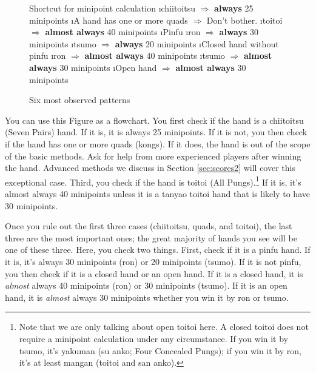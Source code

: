 \bigskip

\begin{figure}[h!]
\begin{itembox}[c]{Shortcut for minipoint calculation}
\be
\i {\jap chiitoitsu} $\Rightarrow$ {\bf always} 25 minipoints
\i A hand has one or more quads $\Rightarrow$ Don't bother. %
\i {\jap toitoi} $\Rightarrow$ {\bf almost always} 40 minipoints
\i {\jap Pinfu}
	\bi
	\i {\jap ron} $\Rightarrow$ {\bf always} 30 minipoints
	\i {\jap tsumo} $\Rightarrow$ {\bf always} 20 minipoints
	\ei
\i Closed hand without {\jap pinfu}
	\bi
	\i {\jap ron} $\Rightarrow$ {\bf almost always} 40 minipoints
	\i {\jap tsumo} $\Rightarrow$ {\bf almost always} 30 minipoints
	\ei
\i Open hand $\Rightarrow$ {\bf almost always} 30 minipoints
\ee
\end{itembox}
\caption{Six most observed patterns}\label{fig:mini}
\end{figure}

You can use this Figure as a flowchart.
You first check if the hand is a {\jap chiitoitsu} (Seven Pairs) hand. If it is, it is always 25 minipoints. If it is not, you then check if the hand has one or more quads (kongs). If it does, the hand is out of the scope of the basic methods. Ask for help from more experienced players after winning the hand. Advanced methods we discuss in Section \ref{sec:scores2} will cover this exceptional case.
Third, you check if the hand is {\jap toitoi} (All Pungs).\footnote{Note that we are only talking about open {\jap toitoi} here. A closed {\jap toitoi} does not require a minipoint calculation under any circumstance. If you win it by {\jap tsumo}, it's {\jap yakuman} ({\jap su anko}; Four Concealed Pungs); if you win it by {\jap ron}, it's at least {\jap mangan} ({\jap toitoi} and {\jap san anko}).} If it is, it's almost always 40 minipoints unless it is a {\jap tanyao toitoi} hand that is likely to have 30 minipoints.

\bigskip
Once you rule out the first three cases ({\jap chiitoitsu}, quads, and {\jap toitoi}), the last three are the most important ones; the great majority of hands you see will be one of these three. Here, you check two things.
First, check if it is a {\jap pinfu} hand. If it is, it's always 30 minipoints ({\jap ron}) or 20 minipoints ({\jap tsumo}).
If it is not {\jap pinfu}, you then check if it is a closed hand or an open hand. If it is a closed hand, it is \emph{almost} always 40 minipoints ({\jap ron}) or 30 minipoints ({\jap tsumo}). If it is an open hand, it is \emph{almost} always 30 minipoints whether you win it by {\jap ron} or {\jap tsumo}.

